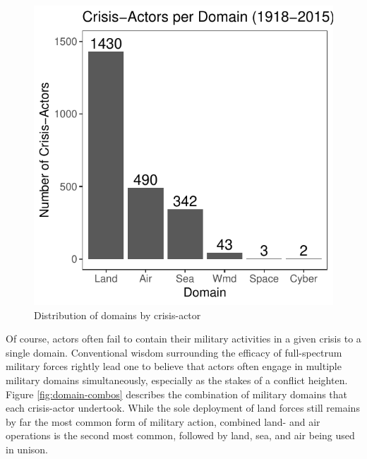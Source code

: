 \documentclass[
]{article}
\begin{document}
\begin{figure}[h!]

{\centering \includegraphics{2021-03-26_ICB-Domains_files/figure-latex/domain-count-1} 

}

\caption{Distribution of domains by crisis-actor}\label{fig:domain-count}
\end{figure}

Of course, actors often fail to contain their military activities in a given crisis to a single domain. Conventional wisdom surrounding the efficacy of full-spectrum military forces rightly lead one to believe that actors often engage in multiple military domains simultaneously, especially as the stakes of a conflict heighten. Figure \ref{fig:domain-combos} describes the combination of military domains that each crisis-actor undertook. While the sole deployment of land forces still remains by far the most common form of military action, combined land- and air operations is the second most common, followed by land, sea, and air being used in unison.
\end{document}
